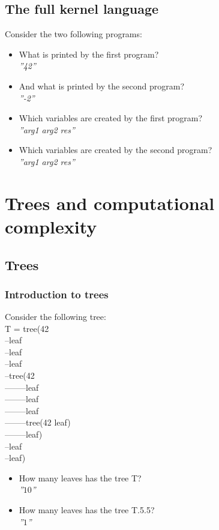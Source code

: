 \documentclass[fr,license=none]{../../../eplsummary}
\begin{document}
		\subsection{The full kernel language}
			Consider the two following programs:
			
			\begin{itemize}
				\item What is printed by the first program?\\
					\textit{''42''}
				\item And what is printed by the second program?\\
					\textit{''-2''}
				\item Which variables are created by the first program?\\
					\textit{''arg1 arg2 res''}
				\item Which variables are created by the second program?\\
					\textit{''arg1 arg2 res''}
			\end{itemize}
			
	\section{Trees and computational complexity}
		\subsection{Trees}
			\subsubsection*{Introduction to trees}
				Consider the following tree:\\
				T = tree(42\\
				--leaf\\
				--leaf\\
				--leaf\\
				--tree(42\\
				--------leaf\\
				--------leaf\\
				--------leaf\\
				--------tree(42 leaf)\\
				--------leaf)\\
				--leaf\\
				--leaf)
				\begin{itemize}
					\item How many leaves has the tree T?\\
						\textit{''$10$''}
					\item How many leaves has the tree T.5.5?\\
						\textit{''$1$''}
				\end{itemize}
\end{document}
